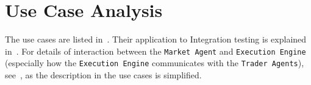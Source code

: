 \section{Use Case Analysis}
The use cases are listed in~. Their application to Integration testing is explained in~. For details of interaction between the \texttt{Market Agent} and \texttt{Execution Engine} (especially how the \texttt{Execution Engine} communicates with the \texttt{Trader Agents}), see~, as the description in the use cases is simplified.
